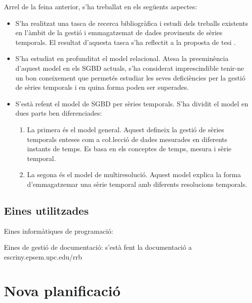 Arrel de la feina anterior, s'ha treballat en els següents aspectes:
\begin{itemize}
\item S'ha realitzat una tasca de recerca bibliogràfica i estudi dels
  treballs existents en l'àmbit de la gestió i emmagatzemat de dades
  provinents de sèries temporals. El resultat d'aquesta tasca s'ha
  reflectit a la proposta de tesi \parencite{llusa12:ptd}.
\item S'ha estudiat en profunditat el model relacional. Atesa la
  preeminència d'aquest model en els SGBD actuals, s'ha considerat
  imprescindible tenir-ne un bon coneixement que permetés estudiar les
  seves deficiències per la gestió de sèries temporals i en quina
  forma poden ser superades.
\item S'està refent el model de SGBD per sèries temporals.  S'ha
  dividit el model en dues parts ben diferenciades:
  \begin{enumerate}
  \item La primera és el model general. Aquest defineix la gestió de
    sèries temporals enteses com a co\l.lecció de dades mesurades en
    diferents instants de temps. Es basa en els conceptes de temps,
    mesura i sèrie temporal.
  \item La segona és el model de multiresolució. Aquest model explica
    la forma d'emmagatzemar una sèrie temporal amb diferents
    resolucions temporals.
  \end{enumerate}
\end{itemize}



\subsection{Eines utilitzades}

Eines informàtiques de programació:

Eines de gestió de documentació: s'està fent la documentació a escriny.epsem.upc.edu/rrb





\section{Nova planificació}


